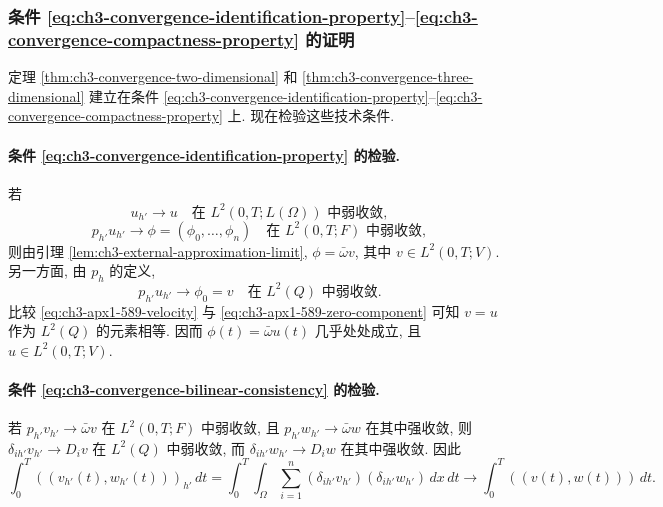 \hypertarget{chapter-03-page-265}{}
\subsubsection{条件 \eqref{eq:ch3-convergence-identification-property}--\eqref{eq:ch3-convergence-compactness-property} 的证明}
定理 \ref{thm:ch3-convergence-two-dimensional} 和 \ref{thm:ch3-convergence-three-dimensional} 建立在条件 \eqref{eq:ch3-convergence-identification-property}--\eqref{eq:ch3-convergence-compactness-property} 上. 现在检验这些技术条件.

\paragraph{条件 \eqref{eq:ch3-convergence-identification-property} 的检验.}
若
\begin{equation}
u_{h'}\to u\quad\text{在 $L^2(0,T;L(\Omega))$ 中弱收敛},
\label{eq:ch3-apx1-589-velocity}
\end{equation}
\begin{equation}
p_{h'}u_{h'}\to\phi=(\phi_0,\ldots,\phi_n)
\quad\text{在 $L^2(0,T;F)$ 中弱收敛},
\label{eq:ch3-apx1-589-image}
\end{equation}
则由引理 \ref{lem:ch3-external-approximation-limit}, $\phi=\bar\omega v$, 其中 $v\in L^2(0,T;V)$. 另一方面, 由 $p_h$ 的定义,
\begin{equation}
p_{h'}u_{h'}\to\phi_0=v\quad\text{在 $L^2(Q)$ 中弱收敛}.
\label{eq:ch3-apx1-589-zero-component}
\end{equation}
比较 \eqref{eq:ch3-apx1-589-velocity} 与 \eqref{eq:ch3-apx1-589-zero-component} 可知 $v=u$ 作为 $L^2(Q)$ 的元素相等. 因而 $\phi(t)=\bar\omega u(t)$ 几乎处处成立, 且 $u\in L^2(0,T;V)$.

\paragraph{条件 \eqref{eq:ch3-convergence-bilinear-consistency} 的检验.}
若 $p_{h'}v_{h'}\to\bar\omega v$ 在 $L^2(0,T;F)$ 中弱收敛, 且 $p_{h'}w_{h'}\to\bar\omega w$ 在其中强收敛, 则 $\delta_{ih'}v_{h'}\to D_i v$ 在 $L^2(Q)$ 中弱收敛, 而 $\delta_{ih'}w_{h'}\to D_iw$ 在其中强收敛. 因此
\[
\int_0^T((v_{h'}(t),w_{h'}(t)))_{h'}\,dt
=\int_0^T\!\int_\Omega\sum_{i=1}^n(\delta_{ih'}v_{h'})(\delta_{ih'}w_{h'})\,dx\,dt
\to\int_0^T((v(t),w(t)))\,dt.
\]

